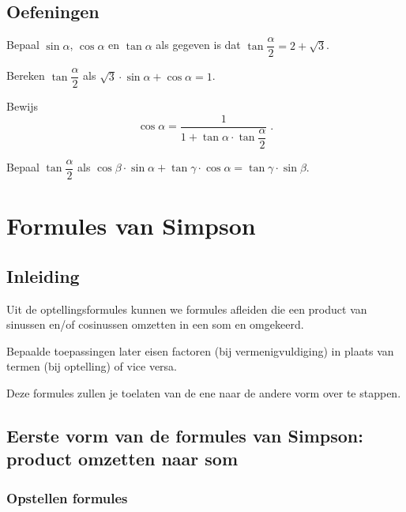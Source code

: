 \documentclass[twoside,a4paper,12pt]{article}
\begin{document}
\subsection{Oefeningen}

\begin{oefening}
Bepaal $\sin\alpha$, $\cos\alpha$ en $\tan\alpha$ als gegeven is dat $\tan\dfrac{\alpha}{2}=2+\sqrt{3}$.
\end{oefening}

\begin{oefening}
Bereken $\tan\dfrac{\alpha}{2}$ als $\sqrt{3}\cdot\sin\alpha+\cos\alpha=1$.
\end{oefening}

\begin{oefening}
Bewijs
$$\cos\alpha=\dfrac{1}{1+\tan\alpha\cdot\tan\dfrac{\alpha}{2}}\;.$$
\end{oefening}

\begin{oefening}
Bepaal $\tan\dfrac{\alpha}{2}$ als $\cos\beta\cdot\sin\alpha+\tan\gamma\cdot\cos\alpha=\tan\gamma\cdot\sin\beta$.
\end{oefening}

\cleardoublepage
\section{Formules van Simpson}

\subsection{Inleiding}

Uit de optellingsformules kunnen we formules afleiden die een product van
sinussen en/of cosinussen omzetten in een som en omgekeerd.

Bepaalde toepassingen later eisen factoren (bij vermenigvuldiging) in plaats van
termen (bij optelling) of vice versa.

Deze formules zullen je toelaten van de ene naar de andere vorm over te stappen.

\subsection{Eerste vorm van de formules van Simpson: product omzetten naar som}

\subsubsection*{Opstellen formules}
\end{document}

